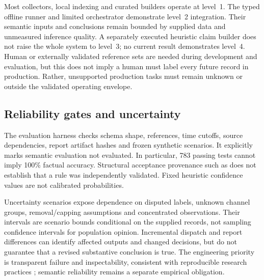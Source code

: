 Most collectors, local indexing and curated builders operate at level~1. The typed offline runner and limited orchestrator demonstrate level~2 integration. Their semantic inputs and conclusions remain bounded by supplied data and unmeasured inference quality. A separately executed heuristic claim builder does not raise the whole system to level~3; no current result demonstrates level~4. Human or externally validated reference sets are needed during development and evaluation, but this does not imply a human must label every future record in production. Rather, unsupported production tasks must remain unknown or outside the validated operating envelope.

\subsection{Reliability gates and uncertainty}
The evaluation harness checks schema shape, references, time cutoffs, source dependencies, report artifact hashes and frozen synthetic scenarios. It explicitly marks semantic evaluation not evaluated. In particular, 783 passing tests cannot imply 100\% factual accuracy. Structural acceptance provenance such as  does not establish that a rule was independently validated. Fixed heuristic confidence values are not calibrated probabilities.

Uncertainty scenarios expose dependence on disputed labels, unknown channel groups, removal/capping assumptions and concentrated observations. Their intervals are scenario bounds conditional on the supplied records, not sampling confidence intervals for population opinion. Incremental dispatch and report differences can identify affected outputs and changed decisions, but do not guarantee that a revised substantive conclusion is true. The engineering priority is transparent failure and inspectability, consistent with reproducible research practices \citep{sandve2013reproducible,wilson2017practices}; semantic reliability remains a separate empirical obligation.
